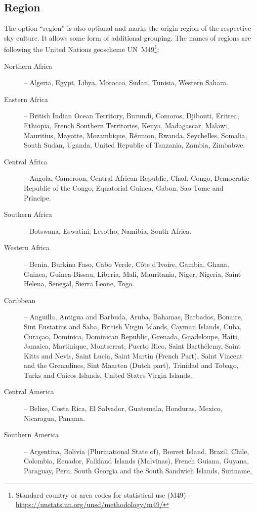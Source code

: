 \subsection{Region}
\label{sec:skycultures:region}
The option ``region'' is also optional and marks the origin region of the respective sky culture. 
It allows some form of additional grouping. The names of regions are following the United Nations
geoscheme UN~M49\footnote{Standard country or area codes for statistical use (M49) -- \url{https://unstats.un.org/unsd/methodology/m49/}}:
\begin{description}
	\item[Northern Africa] -- Algeria, Egypt, Libya, Morocco, Sudan, Tunisia, Western Sahara.
	\item[Eastern Africa] -- British Indian Ocean Territory, Burundi, Comoros, Djibouti, Eritrea, Ethiopia, French Southern Territories, Kenya,
          Madagascar, Malawi, Mauritius, Mayotte, Mozambique, Réunion, Rwanda, Seychelles, Somalia, South Sudan, Uganda, United Republic of Tanzania, Zambia, Zimbabwe.
	\item[Central Africa] -- Angola, Cameroon, Central African Republic, Chad, Congo, Democratic Republic of the Congo, Equatorial Guinea, Gabon, Sao Tome and Principe.
	\item[Southern Africa] -- Botswana, Eswatini, Lesotho, Namibia, South Africa.
	\item[Western Africa] -- Benin, Burkina Faso, Cabo Verde, Côte d’Ivoire, Gambia, Ghana, Guinea, Guinea-Bissau, Liberia,
          Mali, Mauritania, Niger, Nigeria, Saint Helena, Senegal, Sierra Leone, Togo.
	\item[Caribbean] -- Anguilla, Antigua and Barbuda, Aruba, Bahamas, Barbados, Bonaire, Sint Eustatius and Saba, British Virgin Islands,
          Cayman Islands, Cuba, Curaçao, Dominica, Dominican Republic, Grenada, Guadeloupe, Haiti, Jamaica, Martinique, Montserrat, Puerto Rico, Saint Barthélemy,
          Saint Kitts and Nevis, Saint Lucia, Saint Martin (French Part), Saint Vincent and the Grenadines, Sint Maarten (Dutch part),
          Trinidad and Tobago, Turks and Caicos Islands, United States Virgin Islands.
	\item[Central America] -- Belize, Costa Rica, El Salvador, Guatemala, Honduras, Mexico, Nicaragua, Panama.
	\item[Southern America] -- Argentina, Bolivia (Plurinational State of), Bouvet Island, Brazil, Chile, Colombia, Ecuador,
          Falkland Islands (Malvinas), French Guiana, Guyana, Paraguay, Peru, South Georgia and the South Sandwich Islands, Suriname,

\end{description}
